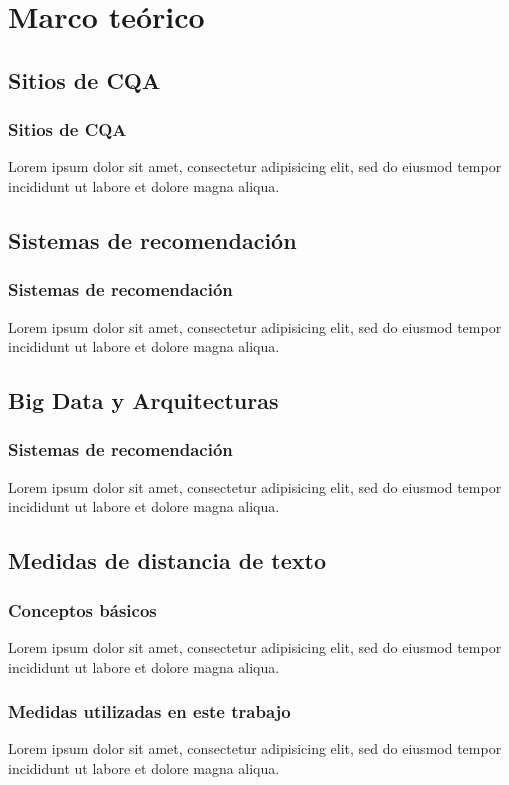 \section{Marco teórico}
\subsection{Sitios de CQA}
\begin{frame}[allowframebreaks]
	\frametitle{Sitios de CQA}
	Lorem ipsum dolor sit amet, consectetur adipisicing elit, sed do eiusmod tempor incididunt ut labore et dolore magna aliqua.
\end{frame}

\subsection{Sistemas de recomendación}
\begin{frame}[allowframebreaks]
	\frametitle{Sistemas de recomendación}
	Lorem ipsum dolor sit amet, consectetur adipisicing elit, sed do eiusmod tempor incididunt ut labore et dolore magna aliqua.
\end{frame}

\subsection{Big Data y Arquitecturas}
\begin{frame}[allowframebreaks]
	\frametitle{Sistemas de recomendación}
	Lorem ipsum dolor sit amet, consectetur adipisicing elit, sed do eiusmod tempor incididunt ut labore et dolore magna aliqua.
\end{frame}

\subsection{Medidas de distancia de texto}
\begin{frame}[allowframebreaks]
	\frametitle{Conceptos básicos}
	Lorem ipsum dolor sit amet, consectetur adipisicing elit, sed do eiusmod tempor incididunt ut labore et dolore magna aliqua.
\end{frame}

\begin{frame}[allowframebreaks]
	\frametitle{Medidas utilizadas en este trabajo}
	Lorem ipsum dolor sit amet, consectetur adipisicing elit, sed do eiusmod tempor incididunt ut labore et dolore magna aliqua.
\end{frame}

